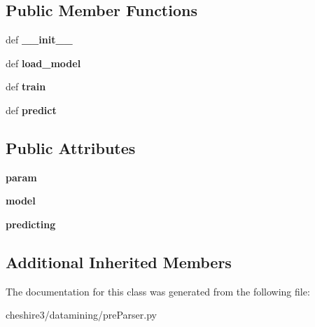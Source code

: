 \subsection*{Public Member Functions}
\begin{DoxyCompactItemize}
\item 
\hypertarget{classcheshire3_1_1datamining_1_1pre_parser_1_1_lib_s_v_m_pre_parser_a2bf9d0de574130c18e7163fd043b1b48}{def {\bfseries \-\_\-\-\_\-init\-\_\-\-\_\-}}\label{classcheshire3_1_1datamining_1_1pre_parser_1_1_lib_s_v_m_pre_parser_a2bf9d0de574130c18e7163fd043b1b48}

\item 
\hypertarget{classcheshire3_1_1datamining_1_1pre_parser_1_1_lib_s_v_m_pre_parser_aba7e16bb87ba31447d596fd1d9cb41d4}{def {\bfseries load\-\_\-model}}\label{classcheshire3_1_1datamining_1_1pre_parser_1_1_lib_s_v_m_pre_parser_aba7e16bb87ba31447d596fd1d9cb41d4}

\item 
\hypertarget{classcheshire3_1_1datamining_1_1pre_parser_1_1_lib_s_v_m_pre_parser_a22ee4340d53542a3884b6ef4e4a240c0}{def {\bfseries train}}\label{classcheshire3_1_1datamining_1_1pre_parser_1_1_lib_s_v_m_pre_parser_a22ee4340d53542a3884b6ef4e4a240c0}

\item 
\hypertarget{classcheshire3_1_1datamining_1_1pre_parser_1_1_lib_s_v_m_pre_parser_a7e8d5ddd5560581b85f284a4a27d3d69}{def {\bfseries predict}}\label{classcheshire3_1_1datamining_1_1pre_parser_1_1_lib_s_v_m_pre_parser_a7e8d5ddd5560581b85f284a4a27d3d69}

\end{DoxyCompactItemize}
\subsection*{Public Attributes}
\begin{DoxyCompactItemize}
\item 
\hypertarget{classcheshire3_1_1datamining_1_1pre_parser_1_1_lib_s_v_m_pre_parser_a1ba6df73cf4c081fbe64396cbc2688e4}{{\bfseries param}}\label{classcheshire3_1_1datamining_1_1pre_parser_1_1_lib_s_v_m_pre_parser_a1ba6df73cf4c081fbe64396cbc2688e4}

\item 
\hypertarget{classcheshire3_1_1datamining_1_1pre_parser_1_1_lib_s_v_m_pre_parser_ae6c00ddfb292b42cf42e8ce053922082}{{\bfseries model}}\label{classcheshire3_1_1datamining_1_1pre_parser_1_1_lib_s_v_m_pre_parser_ae6c00ddfb292b42cf42e8ce053922082}

\item 
\hypertarget{classcheshire3_1_1datamining_1_1pre_parser_1_1_lib_s_v_m_pre_parser_a1714c19264eb6f552dca1d2c2cb1c068}{{\bfseries predicting}}\label{classcheshire3_1_1datamining_1_1pre_parser_1_1_lib_s_v_m_pre_parser_a1714c19264eb6f552dca1d2c2cb1c068}

\end{DoxyCompactItemize}
\subsection*{Additional Inherited Members}


The documentation for this class was generated from the following file\-:\begin{DoxyCompactItemize}
\item 
cheshire3/datamining/pre\-Parser.\-py\end{DoxyCompactItemize}
